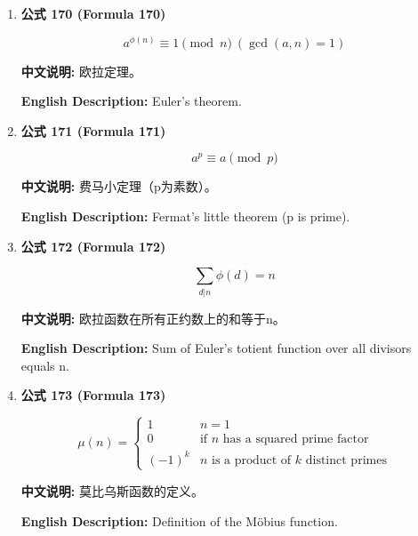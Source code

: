 \documentclass[12pt,a4paper]{article}
\begin{document}
\begin{enumerate}[leftmargin=*]
\vspace{0.5cm}

\item \textbf{公式 170 (Formula 170)}

\begin{equation}
a^{\phi(n)} \equiv 1 \pmod{n}\ (\gcd(a,n)=1)
\end{equation}

\textbf{中文说明:} 欧拉定理。

\textbf{English Description:} Euler's theorem.

\vspace{0.5cm}

\item \textbf{公式 171 (Formula 171)}

\begin{equation}
a^p \equiv a \pmod{p}
\end{equation}

\textbf{中文说明:} 费马小定理（p为素数）。

\textbf{English Description:} Fermat's little theorem (p is prime).

\vspace{0.5cm}

\item \textbf{公式 172 (Formula 172)}

\begin{equation}
\sum_{d|n} \phi(d) = n
\end{equation}

\textbf{中文说明:} 欧拉函数在所有正约数上的和等于n。

\textbf{English Description:} Sum of Euler's totient function over all divisors equals n.

\vspace{0.5cm}

\item \textbf{公式 173 (Formula 173)}

\begin{equation}
\mu(n) = \begin{cases} 1 & n=1 \\ 0 & \text{if } n \text{ has a squared prime factor} \\ (-1)^k & n \text{ is a product of } k \text{ distinct primes} \end{cases}
\end{equation}

\textbf{中文说明:} 莫比乌斯函数的定义。

\textbf{English Description:} Definition of the Möbius function.


\end{enumerate}
\end{document}
